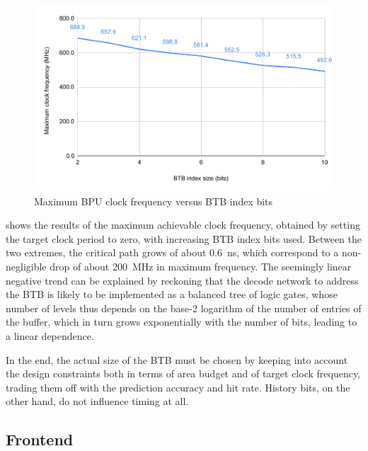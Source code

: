 \begin{figure}[hbt]
  \centering
  \includegraphics[width=\textwidth]{img/bpu_freq.pdf}
  \caption{Maximum \acs{BPU} clock frequency versus \ac{BTB} index bits}
  \label{fig:bpu_freq}
\end{figure}
 shows the results of the maximum achievable clock frequency, obtained by setting the target clock period to zero, with increasing \ac{BTB} index bits used. Between the two extremes, the critical path grows of about \SI{0.6}{ns}, which correspond to a non-negligible drop of about \SI{200}{MHz} in maximum frequency. The seemingly linear negative trend can be explained by reckoning that the decode network to address the \ac{BTB} is likely to be implemented as a balanced tree of logic gates, whose number of levels thus depends on the base-2 logarithm of the number of entries of the buffer, which in turn grows exponentially with the number of bits, leading to a linear dependence.

In the end, the actual size of the \ac{BTB} must be chosen by keeping into account the design constraints both in terms of area budget and of target clock frequency, trading them off with the prediction accuracy and hit rate. History bits, on the other hand, do not influence timing at all.

\subsection{Frontend}
